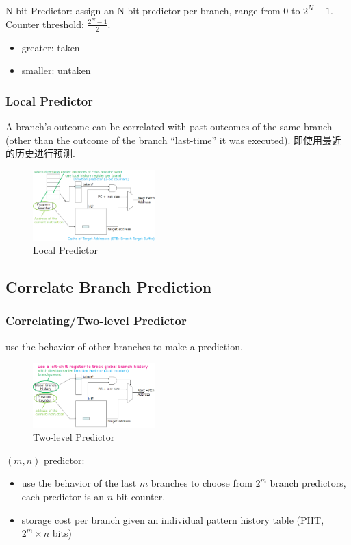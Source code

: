 N-bit Predictor: assign an N-bit predictor per branch, range from $0$ to $2^N - 1$. Counter threshold: $\frac{2^N-1}{2}$.
\begin{itemize}
    \item greater: taken
    \item smaller: untaken
\end{itemize}

\subsubsection{Local Predictor} 
A branch's outcome can be correlated with past outcomes of the same branch (other than the outcome of the branch ``last-time'' it was executed). 即使用最近的历史进行预测. 

\begin{figure}[!htb]
    \centering
    \includegraphics[width=0.42\textwidth]{pic/CA3/Local Predictor}
    \caption{Local Predictor}
\end{figure}

\subsection{Correlate Branch Prediction}
\subsubsection{Correlating/Two-level Predictor}
use the behavior of other branches to make a prediction.

\begin{figure}[!htb]
    \centering
    \includegraphics[width=0.42\textwidth]{pic/CA3/Two-level Predictor}
    \caption{Two-level Predictor}
\end{figure}

$(m, n)$ predictor: 
\begin{itemize}
    \item use the behavior of the last $m$ branches to choose from $2^m$ branch predictors, each predictor is an $n$-bit counter. 
    \item storage cost per branch given an individual pattern history table (PHT, $2^m\times n$ bits)
\end{itemize}


